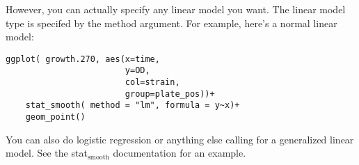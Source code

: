 \documentclass[11pt]{article}
\begin{document}
However, you can actually specify any linear model you want. The
linear model type is specifed by the method argument. For example,
here's a normal linear model:

\begin{verbatim}
ggplot( growth.270, aes(x=time,
                        y=OD,
                        col=strain,
                        group=plate_pos))+
    stat_smooth( method = "lm", formula = y~x)+
    geom_point()
\end{verbatim}


You can also do logistic regression or anything else calling for a
generalized linear model. See the stat$_{\mathrm{smooth}}$ documentation for an example.
\end{document}
